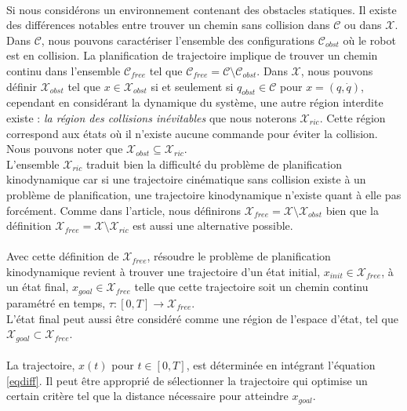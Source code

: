 \documentclass[12pt]{article}
\begin{document}
\paragraph{}
Si nous considérons un environnement contenant des obstacles statiques. Il existe des différences notables entre trouver un chemin sans collision dans $\mathcal{C}$ ou dans $\mathcal{X}$. Dans $\mathcal{C}$, nous pouvons caractériser l'ensemble des configurations $\mathcal{C}_{obst}$ où le robot est en collision. La planification de trajectoire implique de trouver un chemin continu dans l'ensemble $\mathcal{C}_{free}$ tel que $\mathcal{C}_{free}=\mathcal{C}\setminus\mathcal{C}_{obst}$. Dans $\mathcal{X}$, nous pouvons définir $\mathcal{X}_{obst}$ tel que $x \in \mathcal{X}_{obst}$ si et seulement si $q_{obst} \in \mathcal{C}$ pour $x=(q, \dot{q})$, cependant en considérant la dynamique du système, une autre région interdite existe : \textit{la région des collisions inévitables} que nous noterons $\mathcal{X}_{ric}$. Cette région correspond aux états où il n'existe aucune commande pour éviter la collision. Nous pouvons noter que $\mathcal{X}_{obst} \subseteq \mathcal{X}_{ric}$.\\
L'ensemble $\mathcal{X}_{ric}$ traduit bien la difficulté du problème de planification kinodynamique car si une trajectoire cinématique sans collision existe à un problème de planification, une trajectoire kinodynamique n'existe quant à elle pas forcément. Comme dans l'article, nous définirons $\mathcal{X}_{free} = \mathcal{X}\setminus\mathcal{X}_{obst}$ bien que la définition $\mathcal{X}_{free} = \mathcal{X}\setminus\mathcal{X}_{ric}$ est aussi une alternative possible.

\paragraph{}
Avec cette définition de  $\mathcal{X}_{free}$, résoudre le problème de planification kinodynamique revient à  trouver une trajectoire d'un état initial, $x_{init} \in \mathcal{X}_{free}$, à un état final, $x_{goal} \in \mathcal{X}_{free}$ telle que cette trajectoire soit un chemin continu paramétré en temps, $\tau : [0,T] \longrightarrow \mathcal{X}_{free}$.\\
L'état final peut aussi être considéré comme une région de l'espace d'état, tel que $\mathcal{X}_{goal} \subset \mathcal{X}_{free}$.

\paragraph{}
La trajectoire, $x(t)$ pour $t \in [0,T]$, est déterminée en intégrant l'équation \eqref{eqdiff}. Il peut être approprié de sélectionner la trajectoire qui optimise un certain critère tel que la distance nécessaire pour atteindre $x_{goal}$.
\end{document}
